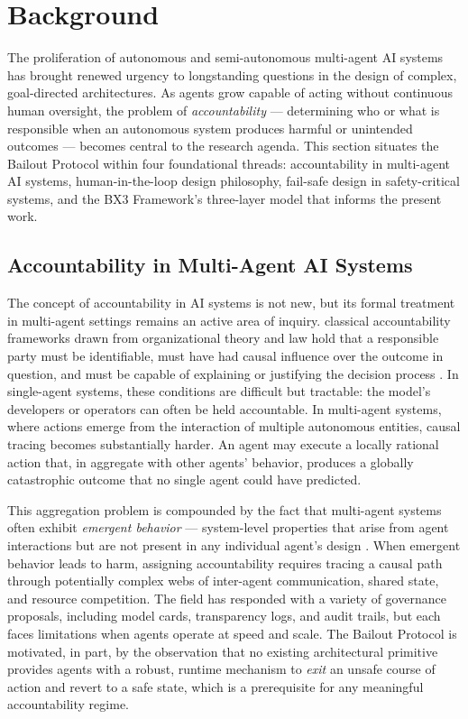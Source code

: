 \section{Background}

The proliferation of autonomous and semi-autonomous multi-agent AI systems has brought renewed urgency to longstanding questions in the design of complex, goal-directed architectures. As agents grow capable of acting without continuous human oversight, the problem of \emph{accountability} — determining who or what is responsible when an autonomous system produces harmful or unintended outcomes — becomes central to the research agenda. This section situates the Bailout Protocol within four foundational threads: accountability in multi-agent AI systems, human-in-the-loop design philosophy, fail-safe design in safety-critical systems, and the BX3 Framework's three-layer model that informs the present work.

\subsection{Accountability in Multi-Agent AI Systems}

The concept of accountability in AI systems is not new, but its formal treatment in multi-agent settings remains an active area of inquiry. classical accountability frameworks drawn from organizational theory and law hold that a responsible party must be identifiable, must have had causal influence over the outcome in question, and must be capable of explaining or justifying the decision process \cite{bansal2019}. In single-agent systems, these conditions are difficult but tractable: the model's developers or operators can often be held accountable. In multi-agent systems, where actions emerge from the interaction of multiple autonomous entities, causal tracing becomes substantially harder. An agent may execute a locally rational action that, in aggregate with other agents' behavior, produces a globally catastrophic outcome that no single agent could have predicted.

This aggregation problem is compounded by the fact that multi-agent systems often exhibit \emph{emergent behavior} — system-level properties that arise from agent interactions but are not present in any individual agent's design \cite{tristr81}. When emergent behavior leads to harm, assigning accountability requires tracing a causal path through potentially complex webs of inter-agent communication, shared state, and resource competition. The field has responded with a variety of governance proposals, including model cards, transparency logs, and audit trails, but each faces limitations when agents operate at speed and scale. The Bailout Protocol is motivated, in part, by the observation that no existing architectural primitive provides agents with a robust, runtime mechanism to \emph{exit} an unsafe course of action and revert to a safe state, which is a prerequisite for any meaningful accountability regime.

